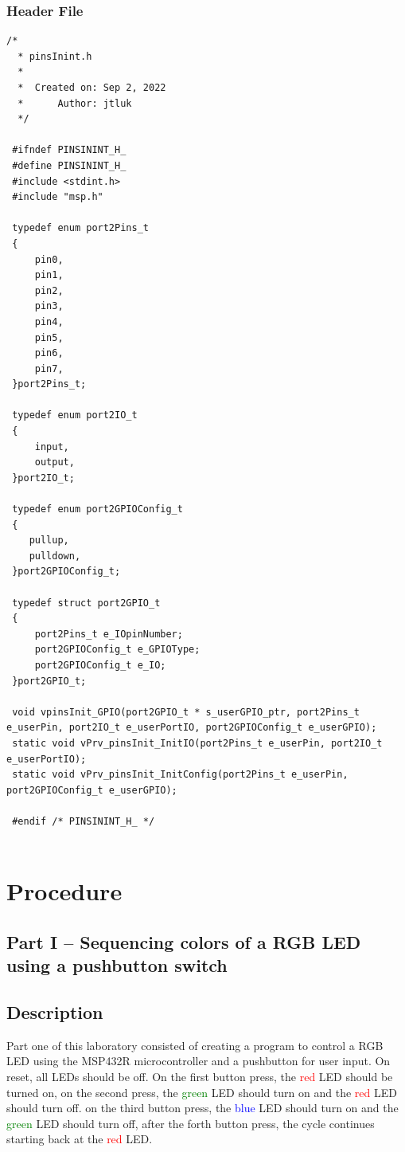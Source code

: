 \documentclass[11pt,a4paper]{article}
\begin{document}
\subsubsection{Header File}
\begin{lstlisting}[style=CStyle]
  /*
  * pinsInint.h
  *
  *  Created on: Sep 2, 2022
  *      Author: jtluk
  */
 
 #ifndef PINSININT_H_
 #define PINSININT_H_
 #include <stdint.h>
 #include "msp.h"
 
 typedef enum port2Pins_t
 {
     pin0,
     pin1,
     pin2,
     pin3,
     pin4,
     pin5,
     pin6,
     pin7,
 }port2Pins_t;
 
 typedef enum port2IO_t
 {
     input,
     output,
 }port2IO_t;
 
 typedef enum port2GPIOConfig_t
 {
    pullup,
    pulldown,
 }port2GPIOConfig_t;
 
 typedef struct port2GPIO_t
 {
     port2Pins_t e_IOpinNumber;
     port2GPIOConfig_t e_GPIOType;
     port2GPIOConfig_t e_IO;
 }port2GPIO_t;
 
 void vpinsInit_GPIO(port2GPIO_t * s_userGPIO_ptr, port2Pins_t e_userPin, port2IO_t e_userPortIO, port2GPIOConfig_t e_userGPIO);
 static void vPrv_pinsInit_InitIO(port2Pins_t e_userPin, port2IO_t e_userPortIO);
 static void vPrv_pinsInit_InitConfig(port2Pins_t e_userPin, port2GPIOConfig_t e_userGPIO);
 
 #endif /* PINSININT_H_ */
 
\end{lstlisting}

\section{Procedure}
\subsection{Part I – Sequencing colors of a RGB LED using a pushbutton switch}
\subsection{Description}
Part one of this laboratory consisted of creating a program to control a RGB LED using the 
MSP432R microcontroller and a pushbutton for user input. On reset, all LEDs should be off. 
On the first button press, the \textcolor{red}{red} LED should be turned on, on the second press,
the \textcolor{green}{green} LED should turn on and the \textcolor{red}{red} LED should turn off.
on the third button press, the \textcolor{blue}{blue} LED should turn on and the \textcolor{green}{green}
LED should turn off, after the forth button press, the cycle continues starting back at the \textcolor{red}{red}
LED.
\end{document}
